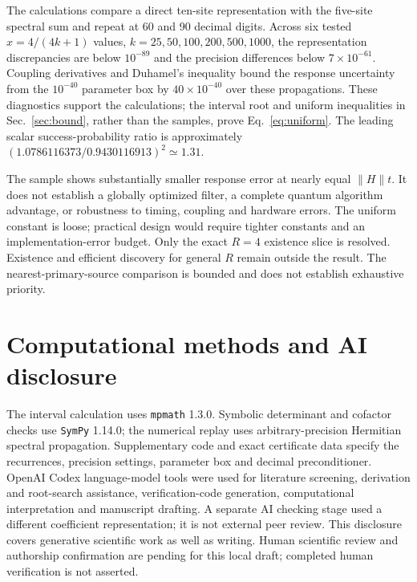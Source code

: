 \documentclass[11pt,a4paper]{article}
\newcommand{\norm}[1]{\lVert #1\rVert}
\numberwithin{equation}{section}
\begin{document}
The calculations compare a direct ten-site representation with the
five-site spectral sum and repeat at 60 and 90 decimal digits.
Across six tested $x=4/(4k+1)$ values, $k=25,50,100,200,500,1000$,
the representation discrepancies are below $10^{-89}$ and the precision
differences below $7\times10^{-61}$. Coupling derivatives and Duhamel's
inequality bound the response uncertainty from the $10^{-40}$ parameter
box by $40\times10^{-40}$ over these propagations. These diagnostics
support the calculations; the interval root and uniform inequalities in
Sec.~\ref{sec:bound}, rather than the samples, prove Eq.~\eqref{eq:uniform}.
The leading scalar success-probability ratio is approximately
$(1.0786116373/0.9430116913)^2\simeq1.31$.

The sample shows substantially smaller response error at nearly equal
$\norm{H}t$. It does not establish a globally optimized filter, a complete
quantum algorithm advantage, or robustness to timing, coupling and hardware
errors. The uniform constant is loose; practical design would require
tighter constants and an implementation-error budget. Only the exact
$R=4$ existence slice is resolved. Existence and efficient discovery for
general $R$ remain outside the result. The nearest-primary-source
comparison is bounded and does not establish exhaustive priority.

\section*{Computational methods and AI disclosure}
The interval calculation uses \texttt{mpmath} 1.3.0. Symbolic determinant
and cofactor checks use \texttt{SymPy} 1.14.0; the numerical replay uses
arbitrary-precision Hermitian spectral propagation. Supplementary code
and exact certificate data specify the recurrences, precision settings,
parameter box and decimal preconditioner.
OpenAI Codex language-model tools were used for literature screening,
derivation and root-search assistance, verification-code generation,
computational interpretation and manuscript drafting. A separate AI
checking stage used a different coefficient representation; it is not
external peer review. This disclosure covers generative scientific work
as well as writing. Human scientific review and authorship confirmation
are pending for this local draft; completed human verification is not
asserted.
\end{document}
